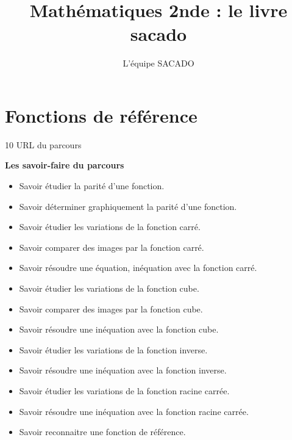 


\usepackage{tkz-tab}


\title{Mathématiques 2nde  : le livre sacado}
\author{L'équipe SACADO}




\chapter{Fonctions de référence}{10}
{URL du parcours}
{
 \begin{CpsCol}
	\textbf{Les savoir-faire du parcours}
 	\begin{itemize}
 		\item Savoir étudier la parité d'une fonction.
		\item Savoir déterminer graphiquement la parité d'une fonction.
 		\item Savoir étudier les variations de la fonction carré.
 		\item Savoir comparer des images par la fonction carré. 
 		\item Savoir résoudre une équation, inéquation avec la fonction carré.
 		\item Savoir étudier les variations de la fonction cube.
 		\item Savoir comparer des images par la fonction cube. 
 		\item Savoir résoudre une inéquation avec la fonction cube.
 		\item Savoir étudier les variations de la fonction inverse.
 		\item Savoir résoudre une inéquation avec la fonction inverse.
 		\item Savoir étudier les variations de la fonction racine carrée.
 		\item Savoir résoudre une inéquation avec la fonction racine carrée.
 		\item Savoir reconnaitre une fonction de référence.
 	\end{itemize}
 \end{CpsCol}

}
